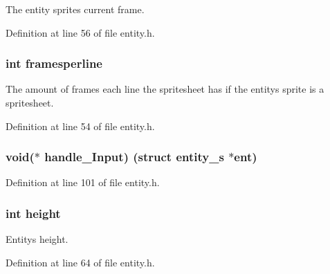 The entity sprite\textquotesingle{}s current frame. 



Definition at line 56 of file entity.\+h.

\hypertarget{structentity__s_a090538eaf48f495a735294df148c1ce7}{}
\subsubsection[{framesperline}]{\setlength{\rightskip}{0pt plus 5cm}int framesperline}\label{structentity__s_a090538eaf48f495a735294df148c1ce7}


The amount of frames each line the spritesheet has if the entity\textquotesingle{}s sprite is a spritesheet. 



Definition at line 54 of file entity.\+h.

\hypertarget{structentity__s_a132b9a4937472ef21d9f098eeae36336}{}
\subsubsection[{handle\+\_\+\+Input}]{\setlength{\rightskip}{0pt plus 5cm}void($\ast$ handle\+\_\+\+Input) (struct {\bf entity\+\_\+s} $\ast$ent)}\label{structentity__s_a132b9a4937472ef21d9f098eeae36336}


Definition at line 101 of file entity.\+h.

\hypertarget{structentity__s_ad12fc34ce789bce6c8a05d8a17138534}{}
\subsubsection[{height}]{\setlength{\rightskip}{0pt plus 5cm}int height}\label{structentity__s_ad12fc34ce789bce6c8a05d8a17138534}


Entity\textquotesingle{}s height. 



Definition at line 64 of file entity.\+h.

\hypertarget{structentity__s_a679cabe3b846f2e363f43d8e57433834}{}
